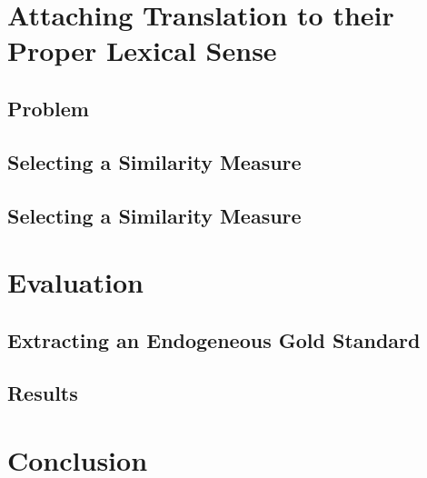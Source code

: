 \documentclass{beamer}
\begin{document}
\section{Attaching Translation to their Proper Lexical Sense}

\subsection{Problem}



\subsection{Selecting a Similarity Measure}

\subsection{Selecting a Similarity Measure}

\section{Evaluation}

\subsection{Extracting an Endogeneous Gold Standard}

\subsection{Results}

\section{Conclusion}

\end{document}
